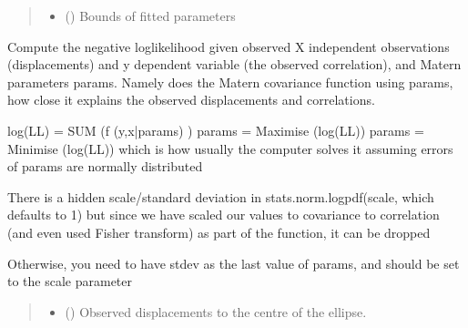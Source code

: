\documentclass[letterpaper,10pt,english]{sphinxmanual}
\begin{document}
\begin{fulllineitems}
\begin{fulllineitems}
\begin{quote}
\begin{description}
\begin{itemize}
\item {}
\sphinxAtStartPar
{} () \textendash{} Bounds of fitted parameters

\end{itemize}


\end{description}\end{quote}

\end{fulllineitems}


\begin{fulllineitems}
\label{\detokenize{ellipse:glomar_gridding.ellipse.EllipseModel.negative_log_likelihood}}
\pysigstartsignatures
\pysiglinewithargsret
{}
{\sphinxparamcomma {}\sphinxparamcomma {}\sphinxparamcomma {}}
{}
\pysigstopsignatures
\sphinxAtStartPar
Compute the negative log\sphinxhyphen{}likelihood given observed X independent
observations (displacements) and y dependent variable (the observed
correlation), and Matern parameters params. Namely does the Matern
covariance function using params, how close it explains the observed
displacements and correlations.

\sphinxAtStartPar
log(LL) = SUM (f (y,x|params) )
params = Maximise (log(LL))
params = Minimise (\sphinxhyphen{}log(LL)) which is how usually the computer solves it
assuming errors of params are normally distributed

\sphinxAtStartPar
There is a hidden scale/standard deviation in
stats.norm.logpdf(scale, which defaults to 1)
but since we have scaled our values to covariance to correlation (and
even used Fisher transform) as part of the function, it can be dropped

\sphinxAtStartPar
Otherwise, you need to have stdev as the last value of params, and
should be set to the scale parameter
\begin{quote}\begin{description}
\begin{itemize}
\item {}
\sphinxAtStartPar
{} () \textendash{} Observed displacements to the centre of the ellipse.


\end{itemize}
\end{description}
\end{quote}
\end{fulllineitems}
\end{fulllineitems}
\end{document}
